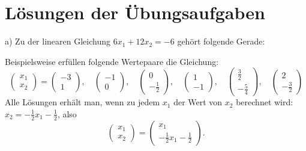 \chapter{Lösungen der Übungsaufgaben}

a) Zu der linearen Gleichung $6x_1 + 12x_2 = -6$ gehört folgende Gerade:

\begin{center}
\end{center}

Beispielsweise erfüllen folgende Wertepaare die Gleichung:
\[ \begin{pmatrix} x_1 \\ x_2 \end{pmatrix} = \begin{pmatrix} -3 \\ 1 \end{pmatrix}, \quad \begin{pmatrix} -1 \\ 0 \end{pmatrix}, \quad \begin{pmatrix} 0 \\ -\tfrac{1}{2} \end{pmatrix}, \quad \begin{pmatrix} 1 \\ -1 \end{pmatrix}, \quad \begin{pmatrix} \tfrac{3}{2} \\ -\tfrac{5}{4} \end{pmatrix}, \quad \begin{pmatrix} 2 \\ -\tfrac{3}{2} \end{pmatrix} \]
Alle Lösungen erhält man, wenn zu jedem $x_1$ der Wert von $x_2$ berechnet wird: $x_2 = -\tfrac{1}{2}x_1 - \tfrac{1}{2}$, also
\[ \begin{pmatrix} x_1 \\ x_2 \end{pmatrix} = \begin{pmatrix} x_1 \\ -\tfrac{1}{2}x_1 - \tfrac{1}{2} \end{pmatrix} . \]

